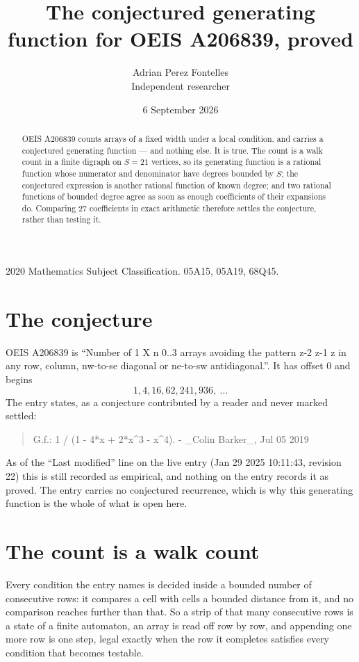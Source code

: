 \documentclass[11pt,a4paper]{article}
\title{The conjectured generating function for OEIS A206839, proved}
\author{Adrian Perez Fontelles\\ \small Independent researcher}
\date{6 September 2026}
\theoremstyle{plain}
\theoremstyle{definition}
\begin{document}
\maketitle

\begin{abstract}
OEIS A206839 counts arrays of a fixed width under a local condition, and carries a conjectured
generating function --- and nothing else. It is true. The count is a walk count in a finite
digraph on $S=21$ vertices, so its generating function is a rational function whose numerator
and denominator have degrees bounded by $S$; the conjectured expression is another rational
function of known degree; and two rational functions of bounded degree agree as soon as enough
coefficients of their expansions do. Comparing $27$ coefficients in exact arithmetic
therefore settles the conjecture, rather than testing it.
\end{abstract}

\noindent\small 2020 Mathematics Subject Classification. 05A15, 05A19, 68Q45.\normalsize

\section{The conjecture}

OEIS A206839 is ``Number of 1 X n 0..3 arrays avoiding the pattern z-2 z-1 z in any row, column, nw-to-se diagonal or ne-to-sw antidiagonal.''. It has offset $0$ and begins
\[
1, 4, 16, 62, 241, 936,\ \dots
\]
The entry states, as a conjecture contributed by a reader and never marked settled:
\begin{quote}
G.f.: 1 / (1 - 4*x + 2*x\^{}3 - x\^{}4). - \_Colin Barker\_, Jul 05 2019
\end{quote}
As of the ``Last modified'' line on the live entry (Jan 29 2025 10:11:43, revision 22) this is still
recorded as empirical, and nothing on the entry records it as proved. The entry carries no
conjectured recurrence, which is why this generating function is the whole of what is open
here.

\section{The count is a walk count}

Every condition the entry names is decided inside a bounded number of consecutive rows: it
compares a cell with cells a bounded distance from it, and no comparison reaches further than
that. So a strip of that many consecutive rows is a state of a finite automaton, an array is
read off row by row, and appending one more row is one step, legal exactly when the row it
completes satisfies every condition that becomes testable.
\end{document}
